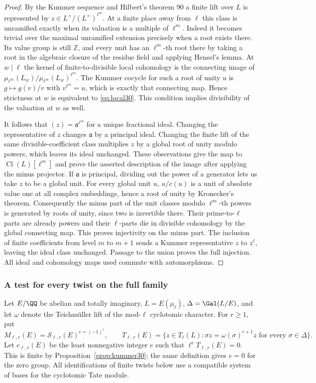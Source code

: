 \documentclass[a4paper,11pt]{article}
\theoremstyle{definition}
\theoremstyle{remark}
\newcommand{\ZZ}{\mathbb Z}\newcommand{\ord}{\operatorname{ord}}
\numberwithin{equation}{section}
\newcommand{\Sel}{\mathcal S}
\newcommand{\Cl}{\operatorname{Cl}}
\begin{document}
\begin{proof}
By the Kummer sequence and Hilbert's theorem 90 a finite lift over \(L\) is represented by \(z\in L^\times/(L^\times)^{\ell^m}\). At a finite place away from \(\ell\) this class is unramified exactly when its valuation is a multiple of \(\ell^m\). Indeed it becomes trivial over the maximal unramified extension precisely when a root exists there. Its value group is still \(\ZZ\), and every unit has an \(\ell^m\)-th root there by taking a root in the algebraic closure of the residue field and applying Hensel's lemma. At \(w\mid\ell\) the kernel of finite-to-divisible local cohomology is the connecting image of \(\mu_{\ell^\infty}(L_w)/\mu_{\ell^\infty}(L_w)^{\ell^m}\). The Kummer cocycle for such a root of unity \(u\) is \(g\mapsto g(v)/v\) with \(v^{\ell^m}=u\), which is exactly that connecting map. Hence strictness at \(w\) is equivalent to \eqref{eq:local30}. This condition implies divisibility of the valuation at \(w\) as well.~\cite{V-III-V-kummer30}

It follows that \((z)=\mathfrak a^{\ell^m}\) for a unique fractional ideal. Changing the representative of \(z\) changes \(\mathfrak a\) by a principal ideal. Changing the finite lift of the same divisible-coefficient class multiplies \(z\) by a global root of unity modulo powers, which leaves its ideal unchanged. These observations give the map to \(\Cl(L)[\ell^m]\) and prove the asserted description of the image after applying the minus projector. If \(\mathfrak a\) is principal, dividing out the power of a generator lets us take \(z\) to be a global unit. For every global unit \(u\), \(u/c(u)\) is a unit of absolute value one at all complex embeddings, hence a root of unity by Kronecker's theorem. Consequently the minus part of the unit classes modulo \(\ell^m\)-th powers is generated by roots of unity, since two is invertible there. Their prime-to-\(\ell\) parts are already powers and their \(\ell\)-parts die in divisible cohomology by the global connecting map. This proves injectivity on the minus part. The inclusion of finite coefficients from level \(m\) to \(m+1\) sends a Kummer representative \(z\) to \(z^\ell\), leaving the ideal class unchanged. Passage to the union proves the full injection. All ideal and cohomology maps used commute with automorphisms.
\end{proof}

\subsubsection{A test for every twist on the full family}\label{nav:III-10}
Let \(E/\QQ\) be abelian and totally imaginary, \(L=E(\mu_\ell)\), \(\Delta=\Gal(L/E)\), and let \(\omega\) denote the Teichm\"uller lift of the mod-\(\ell\) cyclotomic character. For \(r\ge1\), put
\[
 M_{\ell,r}(E)=\Sel_{\ell,r}(E)^{c=(-1)^r},\qquad
 T_{\ell,r}(E)=\{z\in T_\ell(L):\sigma z=\omega(\sigma)^{r+1}z
           \text{ for every }\sigma\in\Delta\}.
\]
Let \(e_{\ell,r}(E)\) be the least nonnegative integer \(e\) such that \(\ell^eT_{\ell,r}(E)=0\). This is finite by Proposition~\ref{prop:kummer30}; the same definition gives \(e=0\) for the zero group. All identifications of finite twists below use a compatible system of bases for the cyclotomic Tate module.
\end{document}
